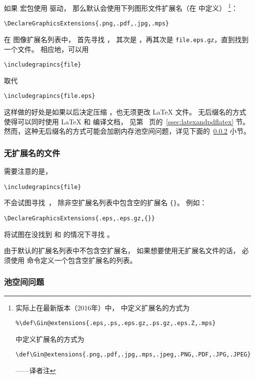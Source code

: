 如果  宏包使用  驱动，
那么默认会使用下列图形文件扩展名（在  中定义）
\footnote{
	实际上在最新版本（2016年）中， 中定义扩展名的方式为
\begin{lstlisting}
%\def\Gin@extensions{.eps,.ps,.eps.gz,.ps.gz,.eps.Z,.mps}
\end{lstlisting}
	 中定义扩展名的方式为
\begin{lstlisting}
\def\Gin@extensions{.png,.pdf,.jpg,.mps,.jpeg,.PNG,.PDF,.JPG,.JPEG}
\end{lstlisting}
	——译者注}：
\begin{lstlisting}
\DeclareGraphicsExtensions{.png,.pdf,.jpg,.mps}
\end{lstlisting}

在  图像扩展名列表中，
 首先寻找 ，
其次是 ，再其次是 \texttt{file.eps.gz}，直到找到一个文件。
相应地，可以用
\begin{lstlisting}
\includegrapincs{file}
\end{lstlisting}
取代
\begin{lstlisting}
\includegrapincs{file.eps}
\end{lstlisting}
这样做的好处是如果以后决定压缩 ，也无须更改 \LaTeX{} 文件。
无后缀名的方式使得可以同时使用 \LaTeX{} 和 \pdfLaTeX{} 编译文档，
见第~\pageref{ssec:latexandpdflatex} 页的~\ref{ssec:latexandpdflatex} 节。
然而，这种无后缀名的方式可能会加剧内存池空间问题，详见下面的~\ref{sssec:poolspaceproblem} 小节。

\subsubsection{无扩展名的文件}
需要注意的是，
\begin{lstlisting}
\includegrapincs{file}
\end{lstlisting}
不会试图寻找~，
除非空扩展名列表中包含空的扩展名 \verb+{}+。
例如：
\begin{lstlisting}
\DeclareGraphicsExtensions{.eps,.eps.gz,{}}
\end{lstlisting}
将试图在没找到  和  的情况下寻找 。

由于默认的扩展名列表中不包含空扩展名，
如果想要使用无扩展名文件的话，
必须使用  命令定义一个包含空扩展名的列表。

\subsubsection{池空间问题}\label{sssec:poolspaceproblem}


